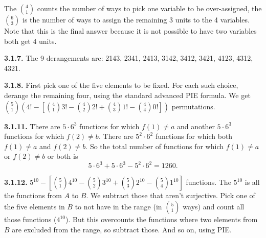 \documentclass[10pt,]{book}
\theoremstyle{plain}
\theoremstyle{definition}
\theoremstyle{definition}
\theoremstyle{definition}
\theoremstyle{definition}
\numberwithin{equation}{chapter}
\begin{document}
%
\par
\hypertarget{p-1040}{}%
The \({4 \choose 1}\) counts the number of ways to pick one variable to be over-assigned, the \({6 \choose 3}\) is the number of ways to assign the remaining 3 units to the 4 variables.  Note that this is the final answer because it is not possible to have two variables both get 4 units.%
\par\smallskip
\noindent\textbf{3.1.7.} \hypertarget{p-1044}{}%
The 9 derangements are: 2143, 2341, 2413, 3142, 3412, 3421, 4123, 4312, 4321.%
\par\smallskip
\noindent\textbf{3.1.8.} \hypertarget{p-1046}{}%
First pick one of the five elements to be fixed.  For each such choice, derange the remaining four, using the standard advanced PIE formula.  We get \({5 \choose 1}\left( 4! - \left[{4 \choose 1}3! - {4 \choose 2}2! + {4 \choose 3} 1! - {4 \choose 4} 0!\right] \right)\) permutations.%
\par\smallskip
\noindent\textbf{3.1.11.} \hypertarget{p-1053}{}%
There are \(5 \cdot 6^3\) functions for which \(f(1) \ne a\) and another \(5 \cdot 6^3\) functions for which \(f(2) \ne b\).  There are \(5^2 \cdot 6^2\) functions for which both \(f(1) \ne a\) and \(f(2) \ne b\).  So the total number of functions for which \(f(1) \ne a\) or \(f(2) \ne b\) or both is%
\begin{equation*}
5 \cdot 6^3 + 5 \cdot 6^3 - 5^2 \cdot 6^2 = 1260.
\end{equation*}
%
\par\smallskip
\noindent\textbf{3.1.12.} \hypertarget{p-1055}{}%
\(5^{10} - \left[{5 \choose 1}4^{10} - {5 \choose 2}3^{10} + {5 \choose 3}2^{10} - {5 \choose 4}1^{10}\right]\) functions.  The \(5^{10}\) is all the functions from \(A\) to \(B\).  We subtract those that aren't surjective.  Pick one of the five elements in \(B\) to not have in the range (in \({5 \choose 1}\) ways) and count all those functions (\(4^{10}\)).  But this overcounts the functions where two elements from \(B\) are excluded from the range, so subtract those.  And so on, using PIE.%
\par\smallskip
\end{document}
